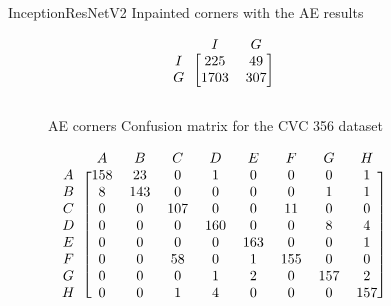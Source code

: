 \begin{figure}[h]
\caption{InceptionResNetV2 Inpainted corners with  the AE results}
\myfontsize
\caption*{\footnotesize \textmd{ \textbf{A}:{dyed-lifted-polyps} , \textbf{B}:{dyed-resection-margins} , \textbf{C}:{esophagitis} , \textbf{D}:{normal-cecum} , \textbf{E}:{normal-pylorus} , \textbf{F}:{normal-z-line} , \textbf{G}:{polyps} , \textbf{H}:{ulcerative-colitis} , \textbf{I}:{non-polyp}}}

\begin{subfigure}[b]{0.25\textwidth}
     
\[
\begin{blockarray}{ccc}
& I & G  \\
\begin{block}{c[cc]}
        I&225  &  49\\
        G& 1703 &  307\\
\end{block}
\end{blockarray}
 \]         

\caption{AE corners Confusion matrix for the CVC 356 dataset}
\label{mat:cvc356_CM_IRV2_AE_CORNER}
\end{subfigure}
\begin{subfigure}[b]{0.49\textwidth}  
\scriptsize     
\[
\begin{blockarray}{ccccccccc}
& A & B & C & D & E & F & G & H \\
\begin{block}{c[cccccccc]}
A&158 & 23 & 0 & 1 & 0 & 0 & 0 & 1\\
B&  8 & 143 & 0 & 0 & 0 & 0 & 1 & 1\\
C&  0 & 0 & 107 & 0 & 0 & 11 & 0 & 0\\
D&  0 & 0 & 0 & 160 & 0 & 0 & 8 & 4\\
E&  0 & 0 & 0 & 0 & 163 & 0 & 0 & 1\\
F&  0 & 0 & 58 & 0 & 1 & 155 & 0 & 0\\
G&  0 & 0 & 0 & 1 & 2 & 0 & 157 & 2\\
H&  0 & 0 & 1 & 4 & 0 & 0 & 0 & 157\\
\end{block}
\end{blockarray}
 \]        
        

\end{subfigure}
\end{figure}
